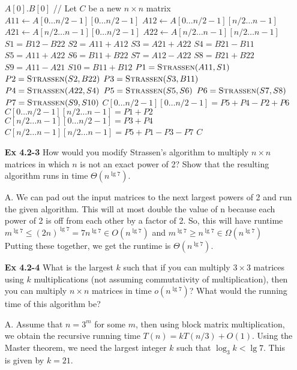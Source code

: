 \documentclass[fontsize=12pt,paper=a4]{book}
\renewcommand{\Comment}[1]{// #1}
\begin{document}
\begin{enumerate}
\begin{algorithm}
\begin{algorithmic}
						\Return $A[0] . B[0]$
					\EndIf
					\Comment{Let $C$ be a new $n \times n$ matrix}
					\State $A11 \gets A[0 \dots n/2-1][0 \dots n/2-1]$
					\State $A12 \gets A[0 \dots n/2-1][n/2 \dots n-1]$
					\State $A21 \gets A[n/2 \dots n-1][0 \dots n/2-1]$
					\State $A22 \gets A[n/2 \dots n-1][n/2 \dots n-1]$
					\State $S1 = B12 - B22$
					\State $S2 = A11 + A12$
					\State $S3 = A21 + A22$
					\State $S4 = B21 - B11$
					\State $S5 = A11 + A22$
					\State $S6 = B11 + B22$
					\State $S7 = A12 - A22$
					\State $S8 = B21 + B22$
					\State $S9 = A11 - A21$
					\State $S10 = B11 + B12$
					\State $P1 = \Call{Strassen}{A11, S1}$
					\State $P2 = \Call{Strassen}{S2, B22}$
					\State $P3 = \Call{Strassen}{S3, B11}$
					\State $P4 = \Call{Strassen}{A22, S4}$
					\State $P5 = \Call{Strassen}{S5, S6}$
					\State $P6 = \Call{Strassen}{S7, S8}$
					\State $P7 = \Call{Strassen}{S9, S10}$
					\State $C[0 \dots n/2-1][0 \dots n/2-1] = P5 + P4 - P2 + P6$
					\State $C[0 \dots n/2-1][n/2 \dots n-1] = P1 + P2$
					\State $C[n/2 \dots n-1][0 \dots n/2-1] = P3 + P4$
					\State $C[n/2 \dots n-1][n/2 \dots n-1] = P5 + P1 - P3 - P7$
					\State \Return $C$
				\EndProcedure
			\end{algorithmic}
		\end{algorithm}
		
	\item[\textbf{Ex 4.2-3}]
		How would you modify Strassen’s algorithm to multiply $n \times n$ matrices in which $n$ is not an exact power of 2? Show that the resulting algorithm runs in time $\Theta(n^{\lg 7})$.
	\item[A.]
	We can pad out the input matrices to the next largest powers of 2 and run the given algorithm. This will at most double the value of n because each power of 2 is off from each other by a factor of 2. So, this will have runtime \\
	$m^{\lg 7} \leq (2n)^{\lg 7} = 7n^{\lg 7} \in O(n^{\lg 7})$ and $m^{\lg 7} \geq n^{\lg 7} \in \Omega(n^{\lg 7})$ \\
	Putting these together, we get the runtime is $\Theta(n^{\lg 7})$.
	
	\item[\textbf{Ex 4.2-4}]
		What is the largest $k$ such that if you can multiply $3 \times 3$ matrices using $k$ multiplications (not assuming commutativity of multiplication), then you can multiply $n \times n$ matrices in time $o(n^{\lg 7})$? What would the running time of this algorithm be?
	\item[A.]
	Assume that $n=3^m$ for some $m$, then using block matrix multiplication, we obtain the recursive running time $T(n) = kT(n/3) + O(1)$. Using the Master theorem, we need the largest integer $k$ such that $\log_3 k < \lg 7$. This is given by $k=21$.


\end{enumerate}
\end{document}
